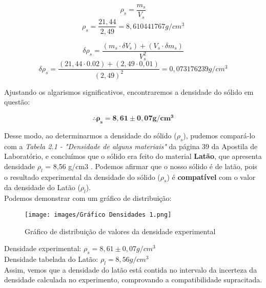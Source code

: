 \[ \rho _s = \frac{m_s}{V_s} \]
\[ \rho _s = \frac{21,44}{2,49} = 8,610441767 g/cm^3 \]

\[ \delta \rho _s =  \frac{(m_s \cdot \delta V_s) + (V_s \cdot \delta m_s)}{V_s^2} \]
\[ \delta \rho _s =  \frac{(21,44 \cdot 0.02) + (2,49 \cdot 0,01)}{(2,49)^2} = 0,073176239  g/cm^3\] 

Ajustando os algarismos significativos, encontraremos a densidade do sólido em questão:

\[\mathbf{\therefore \rho _s = 8,61 \pm 0,07 g/cm^3} \]

Desse modo, ao determinarmos a densidade do sólido ($\rho _s$), pudemos compará-lo com a \textit{Tabela 2.1 - "Densidade de alguns materiais"} da página 39 da Apostila de Laboratório, e concluímos que o sólido era feito do material \textbf{Latão}, que apresenta densidade 
$\rho _l$ = 8,56 g/cm3 . 
Podemos afirmar que o nosso sólido é de latão, pois o resultado experimental da densidade do sólido ($\rho _s$) é \textbf{compatível} com o valor da densidade do Latão ($\rho _l$).\\
Podemos demonstrar com um gráfico de distribuição:

\begin{figure}[H]
    \centering
    \texttt{[image: images/Gráfico Densidades 1.png]}
    \caption{Gráfico de distribuição de valores da densidade experimental}
\end{figure}

Densidade experimental:  $\rho _s = 8,61 \pm 0,07 g/cm^3$\\

Densidade tabelada do Latão: $\rho_l = 8,56 g/cm^3$\\


Assim, vemos que a densidade do latão está contida no intervalo da incerteza da densidade calculada no experimento, comprovando a compatibilidade supracitada.\\